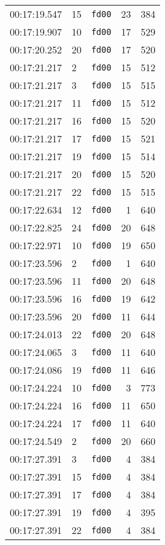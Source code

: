 \documentclass{article}
\begin{document}
\begin{longtable}{lllrr}
00:17:19.547 & 15 & \texttt{fd00} & 23 & 384 \\
00:17:19.907 & 10 & \texttt{fd00} & 17 & 529 \\
00:17:20.252 & 20 & \texttt{fd00} & 17 & 520 \\
00:17:21.217 & 2 & \texttt{fd00} & 15 & 512 \\
00:17:21.217 & 3 & \texttt{fd00} & 15 & 515 \\
00:17:21.217 & 11 & \texttt{fd00} & 15 & 512 \\
00:17:21.217 & 16 & \texttt{fd00} & 15 & 520 \\
00:17:21.217 & 17 & \texttt{fd00} & 15 & 521 \\
00:17:21.217 & 19 & \texttt{fd00} & 15 & 514 \\
00:17:21.217 & 20 & \texttt{fd00} & 15 & 520 \\
00:17:21.217 & 22 & \texttt{fd00} & 15 & 515 \\
00:17:22.634 & 12 & \texttt{fd00} & 1 & 640 \\
00:17:22.825 & 24 & \texttt{fd00} & 20 & 648 \\
00:17:22.971 & 10 & \texttt{fd00} & 19 & 650 \\
00:17:23.596 & 2 & \texttt{fd00} & 1 & 640 \\
00:17:23.596 & 11 & \texttt{fd00} & 20 & 648 \\
00:17:23.596 & 16 & \texttt{fd00} & 19 & 642 \\
00:17:23.596 & 20 & \texttt{fd00} & 11 & 644 \\
00:17:24.013 & 22 & \texttt{fd00} & 20 & 648 \\
00:17:24.065 & 3 & \texttt{fd00} & 11 & 640 \\
00:17:24.086 & 19 & \texttt{fd00} & 11 & 646 \\
00:17:24.224 & 10 & \texttt{fd00} & 3 & 773 \\
00:17:24.224 & 16 & \texttt{fd00} & 11 & 650 \\
00:17:24.224 & 17 & \texttt{fd00} & 11 & 640 \\
00:17:24.549 & 2 & \texttt{fd00} & 20 & 660 \\
00:17:27.391 & 3 & \texttt{fd00} & 4 & 384 \\
00:17:27.391 & 15 & \texttt{fd00} & 4 & 384 \\
00:17:27.391 & 17 & \texttt{fd00} & 4 & 384 \\
00:17:27.391 & 19 & \texttt{fd00} & 4 & 395 \\
00:17:27.391 & 22 & \texttt{fd00} & 4 & 384 \\

\end{longtable}
\end{document}
